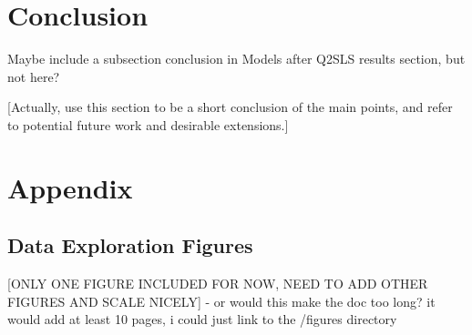 \documentclass[12pt]{article}
\begin{document}
\section{Conclusion}
Maybe include a subsection conclusion in Models after Q2SLS results section, but not here?

\textcolor{BlueGreen}{[Actually, use this section to be a short conclusion of the main points, and refer to potential future work and desirable extensions.]}

\newpage

\singlespacing

\nocite{*} %


\newpage
\section{Appendix}

\subsection{Data Exploration Figures} \label{appendix_figs}
\textcolor{BrickRed}{[ONLY ONE FIGURE INCLUDED FOR NOW, NEED TO ADD OTHER FIGURES AND SCALE NICELY] - or would this make the doc too long? it would add at least 10 pages, i could just link to the /figures directory}
\end{document}
